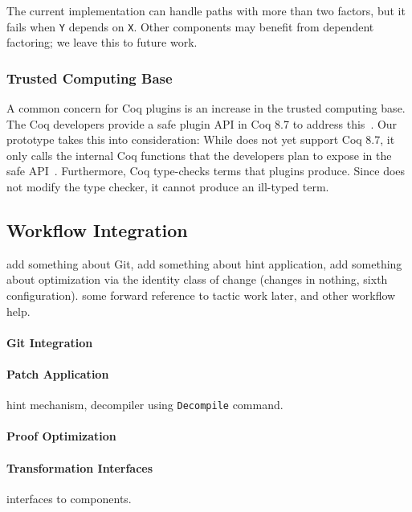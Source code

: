 The current implementation can handle paths
with more than two factors, but it fails when \lstinline{Y} depends on \lstinline{X}.
Other components may benefit from dependent factoring; we leave this to future work.

\subsubsection{Trusted Computing Base}
\label{sec:tcb}

A common concern for Coq plugins is an increase in the trusted computing base.
The Coq developers provide a safe plugin API in Coq 8.7 to address this~\cite{coq87news}.
Our prototype takes this into consideration:
While \sysname does not yet support Coq 8.7, it only calls the internal Coq functions that the 
developers plan to expose in the safe API~\cite{coqPR}.
Furthermore, Coq type-checks terms that plugins produce.
Since \sysname does not modify the type checker, it cannot produce an ill-typed term.

\subsection{Workflow Integration}
\label{sec:workflow}

add something about Git, add something about hint application,
add something about optimization via the identity class of change (changes in nothing, sixth configuration).
some forward reference to tactic work later, and other workflow help.

\paragraph{Git Integration}

\paragraph{Patch Application}
hint mechanism, decompiler using \lstinline{Decompile} command.

\paragraph{Proof Optimization}

\paragraph{Transformation Interfaces} interfaces to components.

